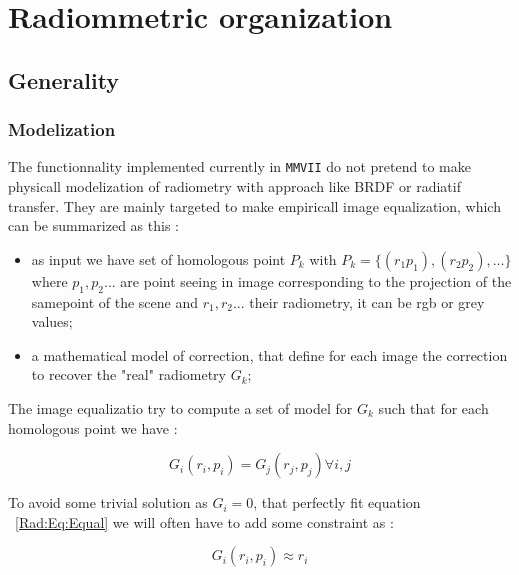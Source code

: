 

\chapter{Radiommetric organization}


\section{Generality}

\subsection{Modelization}

The functionnality implemented currently in {\tt MMVII} do not pretend to make physicall
modelization of radiometry with approach like BRDF or radiatif transfer.
They are mainly targeted to make empiricall image equalization, which
can be summarized as this :

\begin{itemize}
      \item  as input we have set of homologous point $P_k$ with
	      $P_k = \{ (r_1 p_1) , (r_2 p_2) , \dots\}$ where $p_1,p_2 ...$
              are point seeing in image corresponding to the projection
              of the samepoint of the scene and $r_1, r_2 ...$ their 
              radiometry, it can be rgb or grey values;
             
      \item  a mathematical model of correction, that define for each image
	      the correction to recover the "real" radiometry  $G_k$;
\end{itemize}

The image equalizatio try to compute a set of model for $G_k$ such that
for each homologous point we have :

\begin{equation}
	G_i(r_i,p_i) = G_j(r_j,p_j)  \forall i,j \label{Rad:Eq:Equal}
\end{equation}

To avoid some trivial solution as $G_i=0$, that perfectly fit equation ~\ref{Rad:Eq:Equal}
we will often have to add some constraint as :

\begin{equation}
	G_i(r_i,p_i) \approx  r_i
\end{equation}

